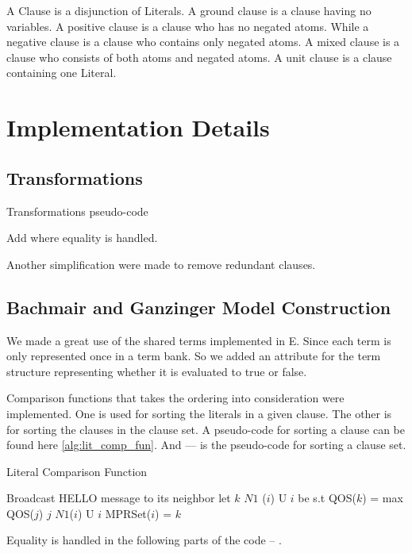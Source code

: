 A Clause is a disjunction of Literals. A ground clause is a clause having no variables. A positive clause is a clause who has no negated atoms. While a negative clause is a clause who contains only negated atoms. A mixed clause is a clause who consists of both atoms and negated atoms. A unit clause is a clause containing one Literal.


\chapter{Implementation Details}\label{chap:appendix_imp}

\section{Transformations}
Transformations pseudo-code


Add where equality is handled.


Another simplification were made to remove redundant clauses.


\section{Bachmair and Ganzinger Model Construction}
We made a great use of the shared terms implemented in E. Since each term is only represented once in a term bank. So we added an attribute for the term structure representing whether it is evaluated to true or false.


Comparison functions that takes the ordering into consideration were implemented. One is used for sorting the literals in a given clause. The other is for sorting the clauses in the clause set. A pseudo-code for sorting a clause can be found here \ref{alg:lit_comp_fun}. And --- is the pseudo-code for sorting a clause set.

\begin{algorithm}
	\caption{Literal Comparison Function}
	\label{alg:lit_comp_fun}
	\begin{algorithmic}[1]
			\State Broadcast HELLO message to its neighbor
			\State let $k$  $N1$ ($i$) U {$i$} be s.t
			\State QOS($k$) = max {QOS($j$) \textbar $j$  $N1$($i$)  U $i$}
			\State MPRSet($i$) = $k$
		\EndFor
	\EndProcedure
	\end{algorithmic}
\end{algorithm}


Equality is handled in the following parts of the code -- .


